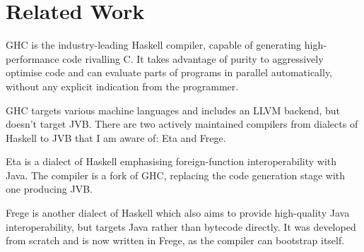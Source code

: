 \documentclass[dissertation.tex]{subfiles}
\begin{document}
\section{Related Work}
{
    GHC is the industry-leading Haskell compiler, capable of generating high-performance code rivalling C. It takes advantage of purity to aggressively optimise code and can evaluate parts of programs in parallel automatically, without any explicit indication from the programmer.

    GHC targets various machine languages and includes an LLVM backend, but doesn't target JVB. There are two actively maintained compilers from dialects of Haskell to JVB that I am aware of: Eta and Frege.


    Eta is a dialect of Haskell emphasising foreign-function interoperability with Java. The  compiler is a fork of GHC, replacing the code generation stage with one producing JVB.

    Frege is another dialect of Haskell which also aims to provide high-quality Java interoperability, but targets Java rather than bytecode directly. It was developed from scratch and is now written in Frege, as the compiler can bootstrap itself. 
}
\end{document}
